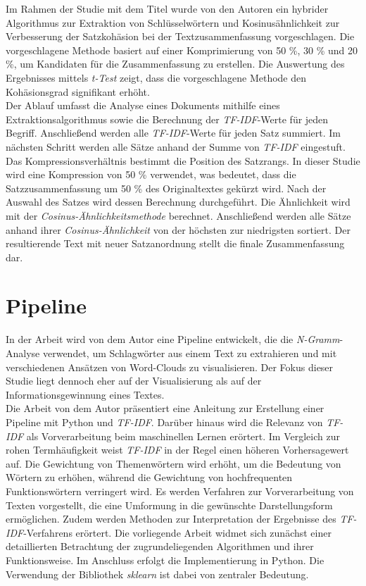 Im Rahmen der Studie mit dem Titel \cite{darmawan2015hybrid} wurde von den Autoren \citeauthor{darmawan2015hybrid} ein hybrider Algorithmus zur Extraktion von Schlüsselwörtern und Kosinusähnlichkeit zur Verbesserung der Satzkohäsion bei der Textzusammenfassung vorgeschlagen. Die vorgeschlagene Methode basiert auf einer Komprimierung von 50 \%, 30 \% und 20 \%, um Kandidaten für die Zusammenfassung zu erstellen. Die Auswertung des Ergebnisses mittels \emph{t-Test} zeigt, dass die vorgeschlagene Methode den Kohäsionsgrad signifikant erhöht.\\
Der Ablauf umfasst die Analyse eines Dokuments mithilfe eines Extraktionsalgorithmus sowie die Berechnung der \emph{TF-IDF}-Werte für jeden Begriff. Anschließend werden alle \emph{TF-IDF}-Werte für jeden Satz summiert. Im nächsten Schritt werden alle Sätze anhand der Summe von \emph{TF-IDF} eingestuft. Das Kompressionsverhältnis bestimmt die Position des Satzrangs. In dieser Studie wird eine Kompression von 50 \% verwendet, was bedeutet, dass die Satzzusammenfassung um 50 \% des Originaltextes gekürzt wird. Nach der Auswahl des Satzes wird dessen Berechnung durchgeführt. Die Ähnlichkeit wird mit der \emph{Cosinus-Ähnlichkeitsmethode} berechnet. Anschließend werden alle Sätze anhand ihrer \emph{Cosinus-Ähnlichkeit} von der höchsten zur niedrigsten sortiert. Der resultierende Text mit neuer Satzanordnung stellt die finale Zusammenfassung dar.\\

\section{Pipeline}
In der Arbeit \cite{pirk2019implementierung} wird von dem Autor \citeauthor{pirk2019implementierung} eine Pipeline entwickelt, die die \emph{N-Gramm}-Analyse verwendet, um Schlagwörter aus einem Text zu extrahieren und mit verschiedenen Ansätzen von Word-Clouds zu visualisieren. Der Fokus dieser Studie liegt dennoch eher auf der Visualisierung als auf der Informationsgewinnung eines Textes.\\

Die Arbeit \cite{lavin2019analyzing} von dem Autor \citeauthor{lavin2019analyzing} präsentiert eine Anleitung zur Erstellung einer Pipeline mit Python und \emph{TF-IDF}. Darüber hinaus wird die Relevanz von \emph{TF-IDF} als Vorverarbeitung beim maschinellen Lernen erörtert. Im Vergleich zur rohen Termhäufigkeit weist \emph{TF-IDF} in der Regel einen höheren Vorhersagewert auf. Die Gewichtung von Themenwörtern wird erhöht, um die Bedeutung von Wörtern zu erhöhen, während die Gewichtung von hochfrequenten Funktionswörtern verringert wird. Es werden Verfahren zur Vorverarbeitung von Texten vorgestellt, die eine Umformung in die gewünschte Darstellungsform ermöglichen. Zudem werden Methoden zur Interpretation der Ergebnisse des \emph{TF-IDF}-Verfahrens erörtert. Die vorliegende Arbeit widmet sich zunächst einer detaillierten Betrachtung der zugrundeliegenden Algorithmen und ihrer Funktionsweise. Im Anschluss erfolgt die Implementierung in Python. Die Verwendung der Bibliothek \emph{sklearn} ist dabei von zentraler Bedeutung.\\

